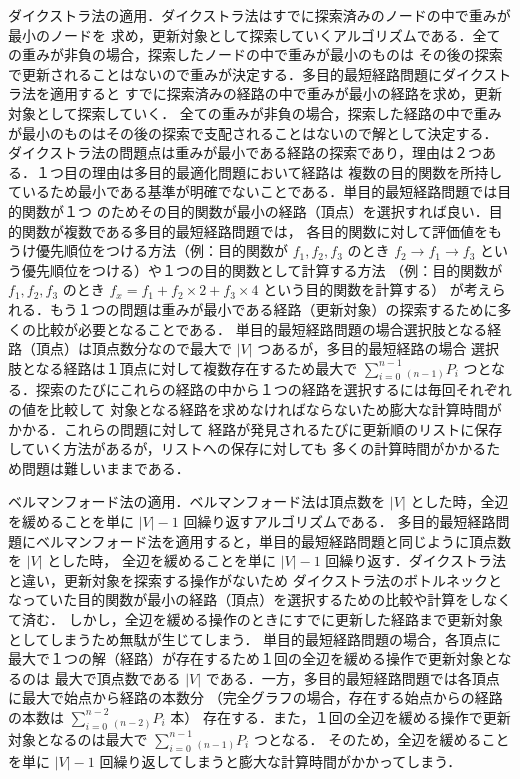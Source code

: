 \documentclass[12pt]{optlab-bachelor}
\begin{document}
ダイクストラ法の適用．ダイクストラ法はすでに探索済みのノードの中で重みが最小のノードを
求め，更新対象として探索していくアルゴリズムである．全ての重みが非負の場合，探索したノードの中で重みが最小のものは
その後の探索で更新されることはないので重みが決定する．多目的最短経路問題にダイクストラ法を適用すると
すでに探索済みの経路の中で重みが最小の経路を求め，更新対象として探索していく．
全ての重みが非負の場合，探索した経路の中で重みが最小のものはその後の探索で支配されることはないので解として決定する．
ダイクストラ法の問題点は重みが最小である経路の探索であり，理由は２つある．１つ目の理由は多目的最適化問題において経路は
複数の目的関数を所持しているため最小である基準が明確でないことである．単目的最短経路問題では目的関数が１つ
のためその目的関数が最小の経路（頂点）を選択すれば良い．目的関数が複数である多目的最短経路問題では，
各目的関数に対して評価値をもうけ優先順位をつける方法（例：目的関数が $f_1,f_2,f_3$ のとき
 $f_2 \rightarrow f_1 \rightarrow f_3 $ という優先順位をつける）や１つの目的関数として計算する方法
（例：目的関数が $f_1,f_2,f_3$ のとき $f_x = f_1 + f_2 \times 2 + f_3 \times 4$ という目的関数を計算する）
が考えられる．もう１つの問題は重みが最小である経路（更新対象）の探索するために多くの比較が必要となることである．
単目的最短経路問題の場合選択肢となる経路（頂点）は頂点数分なので最大で $|V|$ つあるが，多目的最短経路の場合
選択肢となる経路は１頂点に対して複数存在するため最大で $\displaystyle \sum_{i=0}^{n-1} {}_{(n-1)}P_i$
つとなる．探索のたびにこれらの経路の中から１つの経路を選択するには毎回それぞれの値を比較して
対象となる経路を求めなければならないため膨大な計算時間がかかる．これらの問題に対して
経路が発見されるたびに更新順のリストに保存していく方法があるが，リストへの保存に対しても
多くの計算時間がかかるため問題は難しいままである．

ベルマンフォード法の適用．ベルマンフォード法は頂点数を $|V|$ とした時，全辺を緩めることを単に $|V|-1$ 回繰り返すアルゴリズムである．
多目的最短経路問題にベルマンフォード法を適用すると，単目的最短経路問題と同じように頂点数を $|V|$ とした時，
全辺を緩めることを単に $|V|-1$ 回繰り返す．ダイクストラ法と違い，更新対象を探索する操作がないため
ダイクストラ法のボトルネックとなっていた目的関数が最小の経路（頂点）を選択するための比較や計算をしなくて済む．
しかし，全辺を緩める操作のときにすでに更新した経路まで更新対象としてしまうため無駄が生じてしまう．
単目的最短経路問題の場合，各頂点に最大で１つの解（経路）が存在するため１回の全辺を緩める操作で更新対象となるのは
最大で頂点数である $|V|$ である．一方，多目的最短経路問題では各頂点に最大で始点から経路の本数分
（完全グラフの場合，存在する始点からの経路の本数は $\displaystyle \sum_{i=0}^{n-2} {}_{(n-2)}P_i$ 本）
存在する．また，１回の全辺を緩める操作で更新対象となるのは最大で $\displaystyle \sum_{i=0}^{n-1} {}_{(n-1)}P_i$ つとなる．
そのため，全辺を緩めることを単に $|V|-1$ 回繰り返してしまうと膨大な計算時間がかかってしまう．
\end{document}
